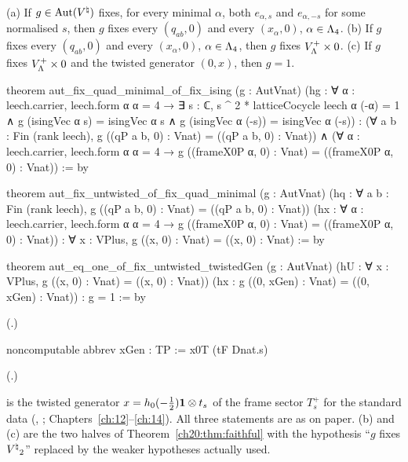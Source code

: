 \begin{lemma}\label{ch20:lem:fixising}
(a) If $g\in\operatorname{Aut}({V^{\natural}})$ fixes, for every minimal $\alpha$, both $e_{\alpha,s}$ and $e_{\alpha,-s}$ for some normalised $s$, then
$g$ fixes every $(q_{ab},0)$ and every $(x_\alpha,0)$, $\alpha\in{\Lambda}_4$.  (b) If $g$ fixes every $(q_{ab},0)$ and every
$(x_\alpha,0)$, $\alpha\in{\Lambda}_4$, then $g$ fixes $V_{\Lambda}^{+}\times0$.  (c) If $g$ fixes $V_{\Lambda}^{+}\times0$ and the
twisted generator $(0,x)$, then $g=1$.
\end{lemma}
\begin{leancode}
theorem aut_fix_quad_minimal_of_fix_ising (g : AutVnat)
    (hg : ∀ α : leech.carrier, leech.form α α = 4 →
      ∃ s : ℂ, s ^ 2 * latticeCocycle leech α (-α) = 1 ∧
        g (isingVec α s) = isingVec α s ∧ g (isingVec α (-s)) = isingVec α (-s)) :
    (∀ a b : Fin (rank leech), g ((qP a b, 0) : Vnat) = ((qP a b, 0) : Vnat)) ∧
      (∀ α : leech.carrier, leech.form α α = 4 →
        g ((frameX0P α, 0) : Vnat) = ((frameX0P α, 0) : Vnat)) := by

theorem aut_fix_untwisted_of_fix_quad_minimal (g : AutVnat)
    (hq : ∀ a b : Fin (rank leech), g ((qP a b, 0) : Vnat) = ((qP a b, 0) : Vnat))
    (hx : ∀ α : leech.carrier, leech.form α α = 4 →
      g ((frameX0P α, 0) : Vnat) = ((frameX0P α, 0) : Vnat)) :
    ∀ x : VPlus, g ((x, 0) : Vnat) = ((x, 0) : Vnat) := by

theorem aut_eq_one_of_fix_untwisted_twistedGen (g : AutVnat)
    (hU : ∀ x : VPlus, g ((x, 0) : Vnat) = ((x, 0) : Vnat))
    (hx : g ((0, xGen) : Vnat) = ((0, xGen) : Vnat)) : g = 1 := by
\end{leancode}
(.)
\begin{leancode}
noncomputable abbrev xGen : TP := x0T (tF Dnat.s)
\end{leancode}
(.)
\begin{dictionary}
 is the twisted generator $x=h_0(-\tfrac12)\mathbf 1\otimes t_s$ of the frame sector $T^+_s$ for the standard
data (, ; Chapters~\ref{ch:12}--\ref{ch:14}).  All three statements are as on paper.  (b) and (c) are
the two halves of Theorem~\ref{ch20:thm:faithful} with the hypothesis ``$g$ fixes ${V^{\natural}}_2$'' replaced by the weaker
hypotheses actually used.
\end{dictionary}
